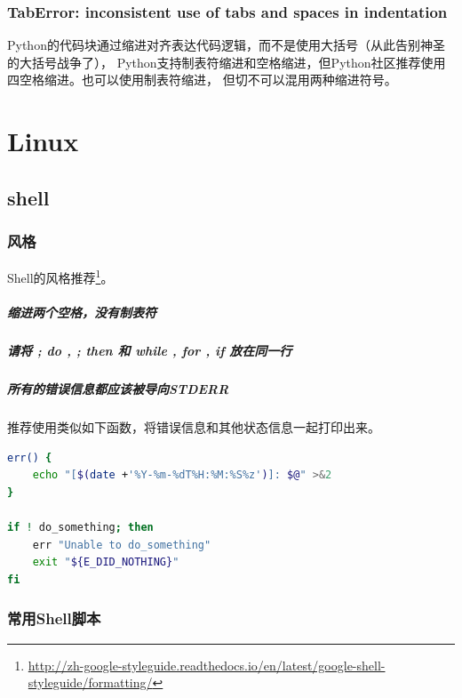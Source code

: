 \documentclass{book}
\begin{document}
\subsection{TabError: inconsistent use of tabs and spaces in indentation}

Python的代码块通过缩进对齐表达代码逻辑，而不是使用大括号（从此告别神圣的大括号战争了），
Python支持制表符缩进和空格缩进，但Python社区推荐使用四空格缩进。也可以使用制表符缩进，
但切不可以混用两种缩进符号。

\chapter{Linux}

\section{shell}

\subsection{风格}

Shell的风格推荐\footnote{\url{http://zh-google-styleguide.readthedocs.io/en/latest/google-shell-styleguide/formatting/}}。

\paragraph{缩进两个空格，没有制表符}
\paragraph{请将 ; do , ; then 和 while , for , if 放在同一行}
\paragraph{所有的错误信息都应该被导向STDERR}
推荐使用类似如下函数，将错误信息和其他状态信息一起打印出来。

\begin{lstlisting}[language=Bash]
err() {
	echo "[$(date +'%Y-%m-%dT%H:%M:%S%z')]: $@" >&2
}

if ! do_something; then
	err "Unable to do_something"
	exit "${E_DID_NOTHING}"
fi
\end{lstlisting}

\subsection{常用Shell脚本}
\end{document}
